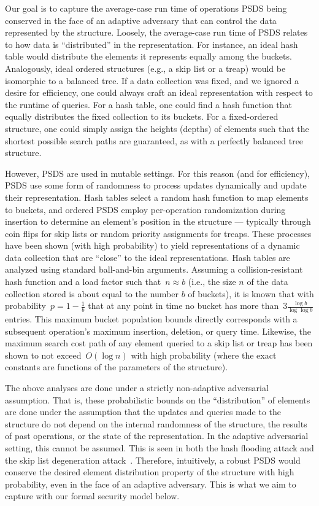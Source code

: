 Our goal is to capture the average-case run time of operations PSDS being conserved in the face of an adaptive adversary that can control the data represented by the structure. Loosely, the average-case run time of PSDS relates to how data is ``distributed'' in the representation.  For instance, an ideal hash table would distribute the elements it represents equally among the buckets. Analogously, ideal ordered structures (e.g., a skip list or a treap) would be isomorphic to a balanced tree. If a data collection was fixed, and we ignored a desire for efficiency, one could always craft an ideal representation with respect to the runtime of queries. For a hash table, one could find a hash function that equally distributes the fixed collection to its buckets. For a fixed-ordered structure, one could simply assign the heights (depths) of elements such that the shortest possible search paths are guaranteed, as with a perfectly balanced tree structure. 

However, PSDS are used in mutable settings. For this reason (and for efficiency), PSDS use some form of randomness to process updates dynamically and update their representation. Hash tables select a random hash function to map elements to buckets, and ordered PSDS employ per-operation randomization during insertion to determine an element's position in the structure --- typically through coin flips for skip lists or random priority assignments for treaps. These processes have been shown (with high probability) to yield representations of a dynamic data collection that are ``close'' to the ideal representations. Hash tables are analyzed using standard ball-and-bin arguments. Assuming a collision-resistant hash function and a load factor such that~$n \approx b$ (i.e., the size $n$ of the data collection stored is about equal to the number $b$ of buckets), it is known \cite{chawla09} that with probability~$p = 1 - \frac{1}{b}$ that at any point in time no bucket has more than~$3\frac{\log b}{\log \log b}$ entries. This maximum bucket population bounds directly corresponds with a subsequent operation's maximum insertion, deletion, or query time. Likewise, the maximum search cost path of any element queried to a skip list or treap has been shown to not exceed~$O (\log n)$ with high probability (where the exact constants are functions of the parameters of the structure).  

The above analyses are done under a strictly non-adaptive adversarial assumption. That is, these probabilistic bounds on the ``distribution'' of elements are done under the assumption that the updates and queries made to the structure do not depend on the internal randomness of the structure, the results of past operations, or the state of the representation. In the adaptive adversarial setting, this cannot be assumed. This is seen in both the hash flooding attack and the skip list degeneration attack~\cite{CrosbyW03,bar2007remote,klink2011efficient,nussbaum2019skiplist}. 
Therefore, intuitively, a robust PSDS would conserve the desired element distribution property of the structure with high probability, even in the face of an adaptive adversary. This is what we aim to capture with our formal security model below.

